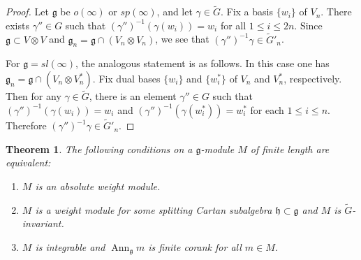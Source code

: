\documentclass{amsart}
\renewcommand{\sl}{sl}
\newcommand{\so}{o}
\renewcommand{\sp}{sp}
\renewcommand{\gg}{\mathfrak{g}}
\newcommand{\hh}{\mathfrak{h}}
\newcommand{\Ann}{\operatorname{Ann}}
\newtheorem{thm}{Theorem}[section]
\theoremstyle{definition}
\numberwithin{equation}{section}
\begin{document}
\begin{proof}
Let $\gg$ be $\so(\infty)$ or $\sp(\infty)$, and let $\gamma \in \tilde{G}$.   Fix a basis $\{ w_i \}$ of $V_n$.  There exists $\gamma'' \in G$ such that $(\gamma'')^{-1} (\gamma (w_i)) = w_i$ for all $1 \leq i \leq 2n$.  Since $\gg \subset V \otimes V$ and $\gg_n = \gg \cap (V_n \otimes V_n)$, we see that $(\gamma'')^{-1} \gamma \in \tilde{G}'_n$.

For $\gg = \sl(\infty)$, the analogous statement is as follows.  In this case one has $\gg_n = \gg \cap (V_n \otimes V_n^*)$.  Fix dual bases  $\{ w_i \}$ and $\{ w_i^* \}$ of $V_n$ and $V_n^*$, respectively.  Then for any $\gamma \in \tilde{G}$, there is an element $\gamma'' \in G$ such that $(\gamma'')^{-1} (\gamma (w_i)) = w_i$ and $(\gamma'')^{-1} (\gamma (w_i^*)) = w_i^*$ for each $1 \leq i \leq n$.  Therefore $(\gamma'')^{-1} \gamma \in \tilde{G}'_n$.
\end{proof}


\begin{thm}\label{th1}
The following conditions on a $\gg$-module $M$ of finite length are equivalent:
\begin{enumerate}
\item \label{1one} $M$ is an absolute weight module.
\item \label{1three} $M$ is a weight module for some splitting Cartan subalgebra $\hh\subset\gg$ and $M$ is $\tilde{G}$-invariant.
\item \label{1four} $M$ is integrable and $\Ann_\gg m$ is finite corank for all $m\in M$.
\end{enumerate}
\end{thm}
\end{document}
